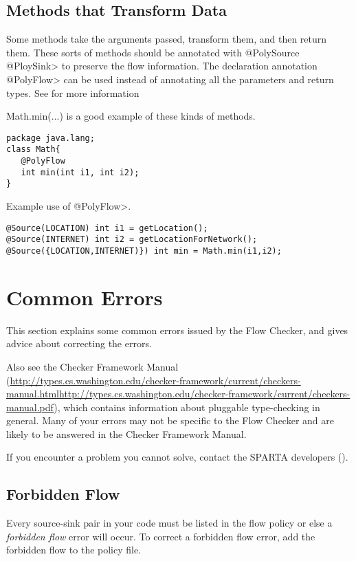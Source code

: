\subsection{Methods that Transform Data}

Some methods take the arguments passed, transform them, and then return them.  These sorts of 
methods should be annotated with \<@PolySource @PloySink>
  to preserve the flow information.  The declaration annotation \<@PolyFlow> can be used instead of
  annotating all the parameters and return types. See  for more information 
  
  Math.min(...) is a good example of these kinds of methods. 
  
  \begin{Verbatim}
package java.lang;
class Math{
   @PolyFlow  
   int min(int i1, int i2);
}
\end{Verbatim}

Example use of \<@PolyFlow>.
\begin{Verbatim}
@Source(LOCATION) int i1 = getLocation();
@Source(INTERNET) int i2 = getLocationForNetwork();
@Source({LOCATION,INTERNET)}) int min = Math.min(i1,i2);
 \end{Verbatim}

\section{Common Errors\label{errors}}

This section explains some common errors issued by the Flow Checker, and
gives advice about correcting the errors.   

Also see the Checker Framework Manual
(\ifhevea\url{http://types.cs.washington.edu/checker-framework/current/checkers-manual.html}\else\url{http://types.cs.washington.edu/checker-framework/current/checkers-manual.pdf}\fi),
which contains information about pluggable type-checking in general.  Many
of your errors may not be specific to the Flow Checker and are likely to be
answered in the Checker Framework Manual.

If you encounter a problem you cannot solve, contact the SPARTA developers ().



\subsection{Forbidden Flow}  
Every source-sink pair in your code must be listed in the flow policy or else a \emph{forbidden flow} error will occur.
To correct a forbidden flow error, add the forbidden flow to the policy file. 
  
